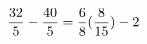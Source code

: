 \documentclass[preview]{standalone}
\begin{document}
\begin{align*}
\special{dvisvgm:raw <g id='unique000'>}\frac{32}{5} - \frac{40}{5} = \frac{6}{8} (\frac{8}{15}) - 2\special{dvisvgm:raw </g>}
\end{align*}
\end{document}
